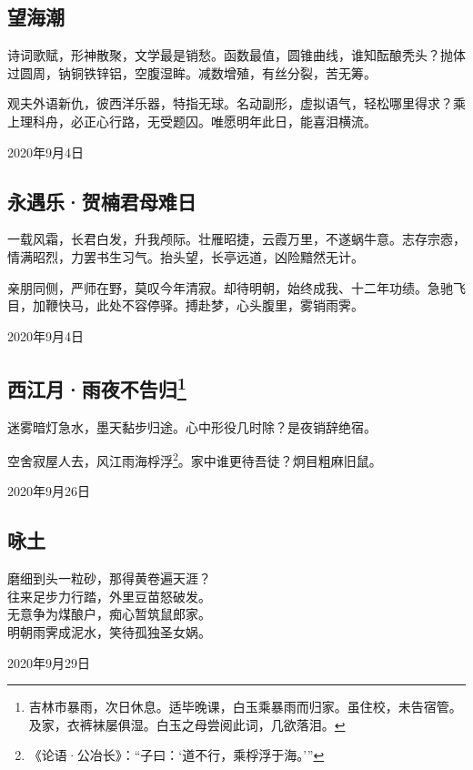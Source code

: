 \documentclass[a5paper]{ctexart}
\begin{document}
	
	\subsection[望海潮（诗词歌赋）]{望海潮}
	诗词歌赋，形神散聚，文学最是销愁。函数最值，圆锥曲线，谁知酝酿秃头？抛体过圆周，钠铜铁锌铝，空腹湿眸。减数增殖，有丝分裂，苦无筹。
	
	观夫外语新仇，彼西洋乐器，特指无球。名动副形，虚拟语气，轻松哪里得求？乘上理科舟，必正心行路，无受题囚。唯愿明年此日，能喜泪横流。
	\begin{flushright}
		2020年9月4日
	\end{flushright}
	
	\subsection{永遇乐·贺楠君母难日}
	一载风霜，长君白发，升我颅际。壮雁昭捷，云霞万里，不遂蜗牛意。志存宗悫，情满昭烈，力罢书生习气。抬头望，长亭远道，凶险黯然无计。
	
	亲朋同侧，严师在野，莫叹今年清寂。却待明朝，始终成我、十二年功绩。急驰飞目，加鞭快马，此处不容停驿。搏赴梦，心头腹里，雾销雨霁。
	\begin{flushright}
		2020年9月4日
	\end{flushright}

	\subsection[西江月·雨夜不告归]{西江月·雨夜不告归\footnote{吉林市暴雨，次日休息。适毕晚课，白玉乘暴雨而归家。虽住校，未告宿管。及家，衣裤袜屡俱湿。白玉之母尝阅此词，几欲落泪。}}
	迷雾暗灯急水，墨天黏步归途。心中形役几时除？是夜销辞绝宿。
	
	空舍寂屋人去，风江雨海桴浮\footnote{《论语·公冶长》：“子曰：‘道不行，乘桴浮于海。’”}。家中谁更待吾徒？炯目粗麻旧鼠。
	\begin{flushright}
		2020年9月26日
	\end{flushright}
	
	\subsection{咏土}
	\begin{center}
		磨细到头一粒砂，那得黄卷遍天涯？\\
		往来足步力行踏，外里豆苗怒破发。\\
		无意争为煤酿户，痴心暂筑鼠郎家。\\
		明朝雨霁成泥水，笑待孤独圣女娲。
	\end{center}
	\hfill 2020年9月29日
	
\end{document}

